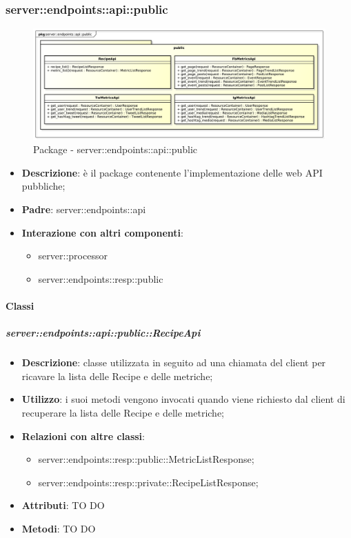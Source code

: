 \subsubsection{server::endpoints::api::public} %
\label{ssub:bdsm_app_server_endpoints_api_public}
\begin{figure}[!htbp]
	\centering
	\centerline{\includegraphics[scale=0.4]{./images/server/api_public.pdf}}
	\caption{Package - server::endpoints::api::public}
\end{figure}

\begin{itemize}
  \item \textbf{Descrizione}: è il package contenente l'implementazione delle web API pubbliche;
  \item \textbf{Padre}: server::endpoints::api
  \item \textbf{Interazione con altri componenti}:
  	\begin{itemize}
        \item server::processor
				\item server::endpoints::resp::public
    \end{itemize}
\end{itemize}

	\paragraph{Classi} %

    \subparagraph{server::endpoints::api::public::RecipeApi} %
    \label{subp:bdsm_app_server_endpoints_api_public_recipeapi}
    \begin{itemize}
      \item \textbf{Descrizione}: classe utilizzata in seguito ad una chiamata del client per ricavare la lista delle Recipe e delle metriche;
      \item \textbf{Utilizzo}: i suoi metodi vengono invocati quando viene richiesto dal client di recuperare la lista delle Recipe e delle metriche;
      \item \textbf{Relazioni con altre classi}:
        \begin{itemize}
          \item server::endpoints::resp::public::MetricListResponse;
          \item server::endpoints::resp::private::RecipeListResponse;
        \end{itemize}
		\item \textbf{Attributi}: TO DO
		\item \textbf{Metodi}: TO DO
      \end{itemize}


